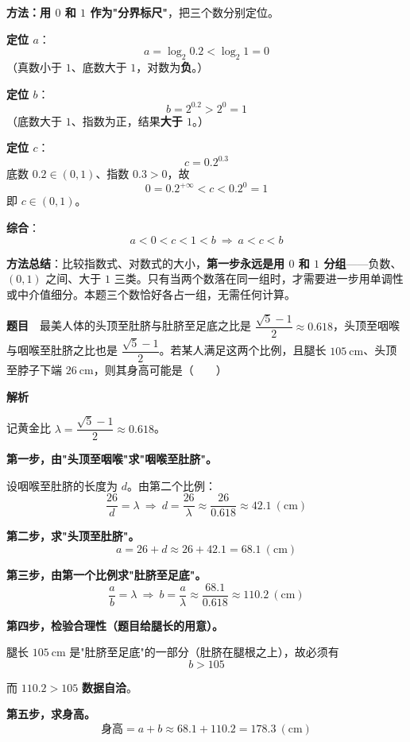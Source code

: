 \textbf{方法：用 $0$ 和 $1$ 作为"分界标尺"}，把三个数分别定位。

\textbf{定位 $a$}：
\[a=\log_2 0.2<\log_2 1=0\]
（真数小于 $1$、底数大于 $1$，对数为\textbf{负}。）

\textbf{定位 $b$}：
\[b=2^{0.2}>2^{0}=1\]
（底数大于 $1$、指数为正，结果\textbf{大于 $1$}。）

\textbf{定位 $c$}：
\[c=0.2^{0.3}\]
底数 $0.2\in(0,1)$、指数 $0.3>0$，故
\[0=0.2^{+\infty}<c<0.2^{0}=1\]
即 $c\in(0,1)$。

\textbf{综合}：
\[a<0<c<1<b\ \Longrightarrow\ a<c<b\]


\begin{gktip}
\textbf{方法总结}：比较指数式、对数式的大小，\textbf{第一步永远是用 $0$ 和 $1$ 分组}——负数、$(0,1)$ 之间、大于 $1$ 三类。只有当两个数落在同一组时，才需要进一步用单调性或中介值细分。本题三个数恰好各占一组，无需任何计算。
\end{gktip}

\par\medskip


\textbf{题目}　最美人体的头顶至肚脐与肚脐至足底之比是 $\dfrac{\sqrt5-1}2\approx0.618$，头顶至咽喉与咽喉至肚脐之比也是 $\dfrac{\sqrt5-1}2$。若某人满足这两个比例，且腿长 $105\ \mathrm{cm}$、头顶至脖子下端 $26\ \mathrm{cm}$，则其身高可能是（　　）

\textbf{解析}

记黄金比 $\lambda=\dfrac{\sqrt5-1}2\approx0.618$。

\textbf{第一步，由"头顶至咽喉"求"咽喉至肚脐"。}

设咽喉至肚脐的长度为 $d$。由第二个比例：
\[\frac{26}{d}=\lambda\ \Longrightarrow\ d=\frac{26}\lambda\approx\frac{26}{0.618}\approx42.1\ (\mathrm{cm})\]

\textbf{第二步，求"头顶至肚脐"。}
\[a=26+d\approx26+42.1=68.1\ (\mathrm{cm})\]

\textbf{第三步，由第一个比例求"肚脐至足底"。}
\[\frac ab=\lambda\ \Longrightarrow\ b=\frac a\lambda\approx\frac{68.1}{0.618}\approx110.2\ (\mathrm{cm})\]

\textbf{第四步，检验合理性（题目给腿长的用意）。}

腿长 $105\ \mathrm{cm}$ 是"肚脐至足底"的一部分（肚脐在腿根之上），故必须有
\[b>105\]

而 $110.2>105$  \textbf{数据自洽}。

\textbf{第五步，求身高。}
\[\text{身高}=a+b\approx68.1+110.2=178.3\ (\mathrm{cm})\]

